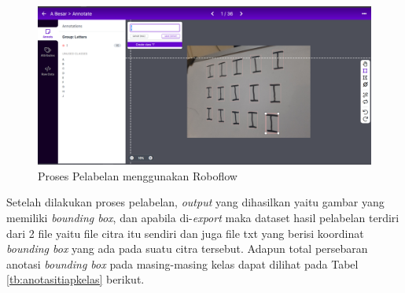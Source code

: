 \begin{figure}[H]
  \centering
  \includegraphics[scale=0.39]{gambar/labelling.png}
  \caption{Proses Pelabelan menggunakan Roboflow}
  \label{fig:labellingroboflow}
\end{figure}

Setelah dilakukan proses pelabelan, \textit{output} yang dihasilkan yaitu gambar yang memiliki \textit{bounding box}, dan apabila di-\textit{export} maka dataset hasil pelabelan terdiri dari 2 file yaitu file citra itu sendiri dan juga file txt yang berisi koordinat \textit{bounding box} yang ada pada suatu citra tersebut. Adapun total persebaran anotasi \textit{bounding box} pada masing-masing kelas dapat dilihat pada Tabel \ref{tb:anotasitiapkelas} berikut. 


